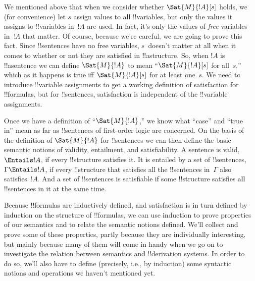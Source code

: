 \documentclass[../../../include/open-logic-section]{subfiles}
\begin{document}

We mentioned above that when we consider whether $\Sat{M}{!A}[s]$
holds, we (for convenience) let $s$ assign values to all !!{variable}s,
but only the values it assigns to !!{variable}s in~$!A$ are used.  In
fact, it's only the values of \emph{free} variables in~$!A$ that
matter. Of course, because we're careful, we are going to prove this
fact. Since !!{sentence}s have no free variables, $s$~doesn't matter
at all when it comes to whether or not they are satisfied in
!!a{structure}.  So, when $!A$ is !!a{sentence} we can define
$\Sat{M}{!A}$ to mean ``$\Sat{M}{!A}[s]$ for all~$s$,'' which as it
happens is true iff $\Sat{M}{!A}[s]$ for at least one~$s$. We need to
introduce !!{variable} assignments to get a working definition of
satisfaction for !!{formula}s, but for !!{sentence}s, satisfaction is
independent of the !!{variable} assignments.

Once we have a definition of ``$\Sat{M}{!A}$,'' we know what ``case''
and ``true in'' mean as far as !!{sentence}s of first-order logic are
concerned. On the basis of the definition of $\Sat{M}{!A}$ for
!!{sentence}s we can then define the basic semantic notions of
validity, entailment, and satisfiability.  A sentence is valid,
$\Entails !A$, if every !!{structure} satisfies it. It is entailed by
a set of !!{sentence}s, $\Gamma \Entails !A$, if every !!{structure}
that satisfies all the !!{sentence}s in~$\Gamma$ also satisfies~$!A$.
And a set of !!{sentence}s is satisfiable if some !!{structure}
satisfies all !!{sentence}s in it at the same time.

Because !!{formula}s are inductively defined, and satisfaction is in
turn defined by induction on the structure of !!{formula}s, we can use
induction to prove properties of our semantics and to relate the
semantic notions defined.  We'll collect and prove some of these
properties, partly because they are individually interesting, but
mainly because many of them will come in handy when we go on to
investigate the relation between semantics and !!{derivation} systems. In order
to do so, we'll also have to define (precisely, i.e., by induction)
some syntactic notions and operations we haven't mentioned yet.
\end{document}
